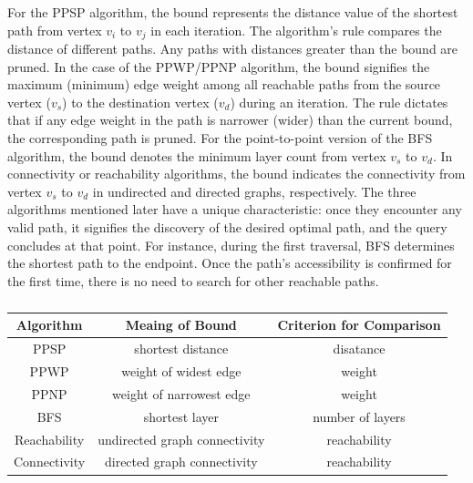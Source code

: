 \documentclass[10pt,journal,compsoc]{IEEEtran}
\begin{document}
For the PPSP algorithm, the bound represents the distance value of the shortest path from vertex $v_i$ to $v_j$ in each iteration. The algorithm's rule compares the distance of different paths. Any paths with distances greater than the bound are pruned.
In the case of the PPWP/PPNP algorithm, the bound signifies the maximum (minimum) edge weight among all reachable paths from the source vertex ($v_s$) to the destination vertex ($v_d$) during an iteration. The rule dictates that if any edge weight in the path is narrower (wider) than the current bound, the corresponding path is pruned.
For the point-to-point version of the BFS algorithm, the bound denotes the minimum layer count from vertex $v_s$ to $v_d$.
In connectivity or reachability algorithms, the bound indicates the connectivity from vertex $v_s$ to $v_d$ in undirected and directed graphs, respectively.
The three algorithms mentioned later have a unique characteristic: once they encounter any valid path, it signifies the discovery of the desired optimal path, and the query concludes at that point. For instance, during the first traversal, BFS determines the shortest path to the endpoint. Once the path's accessibility is confirmed for the first time, there is no need to search for other reachable paths.

\begin{table}[t]
    \centering
    \renewcommand\arraystretch{1.2}
    \scriptsize
    \begin{tabular}{c c c}
    \hline
    \rule{0pt}{8pt} 
    Algorithm           & Meaing of Bound         &Criterion for Comparison\\
    \hline
    \rule{0pt}{8pt}
    PPSP                & shortest distance         & disatance     \\
    PPWP                & weight of widest edge             & weight     \\
    PPNP                & weight of narrowest edge             &weight      \\
    BFS                 & shortest layer              & number of layers      \\
    Reachability        & undirected graph connectivity       & reachability      \\
    Connectivity        & directed graph connectivity         & reachability     \\
    \hline
    \end{tabular}
    \caption{}
    \label{table1}
\end{table}
\vspace{-0.5cm}
\end{document}
